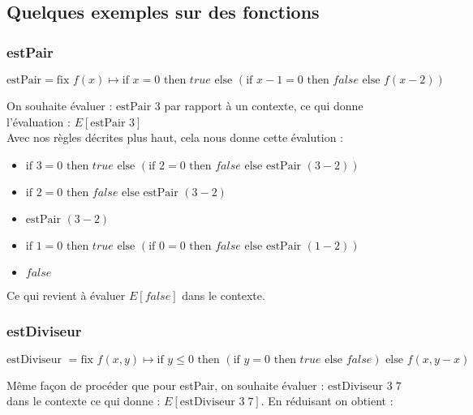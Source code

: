 \documentclass[11pt, a4paper, notitlepage]{article}
\newcommand\tab{{\hspace*{12.5mm}}}
\begin{document}
\subsection{Quelques exemples sur des fonctions}
\subsubsection{estPair}
\begin{center}
   $\text{estPair} = \text{fix } f(x) \mapsto \text{if } x = 0 \text{ then } true \text{ else }(\text{if }x - 1 = 0 \text{ then } false \text{ else }f(x - 2))$\\
\end{center}

\tab On souhaite évaluer : $\text{estPair } 3$ par rapport à un contexte, ce qui donne l'évaluation : $E[\text{estPair }3]$\\
Avec nos règles décrites plus haut, cela nous donne cette évalution :
\begin{itemize}[label=$\to$]
   \item $\text{if }3 = 0 \text{ then }true \text{ else }(\text{if }2 = 0 \text{ then }false \text{ else estPair }(3 - 2))$\\
   \item $\text{if }2 = 0 \text{ then }false \text{ else estPair }(3 - 2)$\\
   \item $\text{estPair }(3 - 2)$\\
   \item $\text{if }1 = 0 \text{ then }true \text{ else }(\text{if }0 = 0 \text{ then }false \text{ else estPair }(1 - 2))$\\
   \item $false$
\end{itemize}
Ce qui revient à évaluer $E[false]$ dans le contexte.

\subsubsection{estDiviseur}
\begin{center}
   $\text{estDiviseur } = \text{fix } f(x,y) \mapsto \text{if } y \leq 0 \text{ then }(\text{if }y = 0 \text{ then } true \text{ else } false) \text{ else } f(x, y-x) $\\
\end{center}

\tab Même façon de procéder que pour estPair, on souhaite évaluer : $\text{estDiviseur }3 \; 7$ dans le contexte ce qui donne : $E[\text{estDiviseur }3 \; 7]$. En réduisant on obtient :
\end{document}
